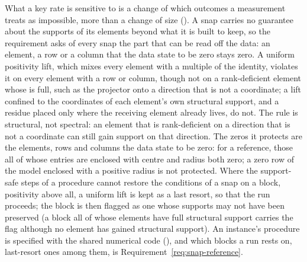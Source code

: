 What a key rate is sensitive to is a change of which outcomes a measurement
treats as impossible, more than a change of size
(). A snap carries no guarantee about the
supports of its elements beyond what it is built to keep, so the requirement
asks of every snap the part that can be read off the data: an element, a row
or a column that the data state to be zero stays zero. A uniform positivity
lift, which mixes every element with a multiple of the identity, violates it
on every element with a  row or column, though not on a
rank-deficient element whose  is full, such as the
projector onto a direction that is not a coordinate; a lift confined to the
coordinates of each element's own structural support, and a residue placed
only where the receiving element already lives, do not. The rule is
structural, not spectral: an element that is rank-deficient on a direction
that is not a coordinate can still gain support on that direction. The zeros
it protects are the elements, rows and columns the data state to be zero:
for a reference, those all of whose entries are enclosed with centre and
radius both zero; a zero row of the model enclosed with a positive radius is
not protected. Where the support-safe steps of a procedure cannot restore
the conditions of a snap on a block, positivity above all, a uniform lift is
kept as a last resort, so that the run proceeds; the block is then flagged as
one whose supports may not have been preserved (a block all of whose elements
have full structural support carries the flag although no element has gained
structural support). An instance's procedure is specified with the shared
numerical code (), and which blocks a run rests
on, last-resort ones among them, is Requirement~\ref{req:snap-reference}.

